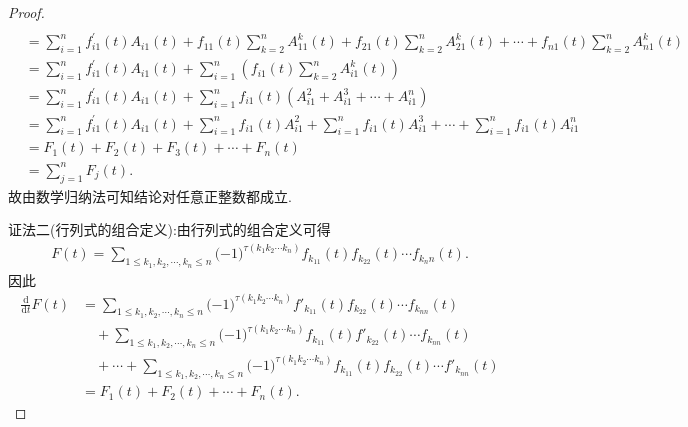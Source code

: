 \documentclass[../../main.tex]{subfiles}%
\begin{document}
\begin{proof}
\begin{align*}
\\
&=\sum_{i=1}^n{f_{i1}^{\prime}\left( t \right) A_{i1}\left( t \right)}+f_{11}\left( t \right) \sum_{k=2}^{n}{A_{11}^{k}(t)}+f_{21}\left( t \right) \sum_{k=2}^{n}{A_{21}^{k}(t)}+\cdots +f_{n1}\left( t \right) \sum_{k=2}^{n}{A_{n1}^{k}(t)}
\\
&=\sum_{i=1}^n{f_{i1}^{\prime}\left( t \right) A_{i1}\left( t \right)}+\sum_{i=1}^n{\left( f_{i1}\left( t \right) \sum_{k=2}^n{A_{i1}^{k}\left( t \right)} \right)}
\\
&=\sum_{i=1}^n{f_{i1}^{\prime}\left( t \right) A_{i1}\left( t \right)}+\sum_{i=1}^n{f_{i1}\left( t \right) \left( A_{i1}^{2}+A_{i1}^{3}+\cdots +A_{i1}^{n} \right)}
\\
&=\sum_{i=1}^n{f_{i1}^{\prime}\left( t \right) A_{i1}\left( t \right)}+\sum_{i=1}^n{f_{i1}\left( t \right) A_{i1}^{2}}+\sum_{i=1}^n{f_{i1}\left( t \right) A_{i1}^{3}}+\cdots +\sum_{i=1}^n{f_{i1}\left( t \right) A_{i1}^{n}}
\\
&=F_1\left( t \right) +F_2\left( t \right) +F_3\left( t \right) +\cdots +F_n\left( t \right) 
\\
&=\sum_{j=1}^n{F_j\left( t \right)}.
\end{align*}
故由数学归纳法可知结论对任意正整数都成立.

{\color{blue}证法二(行列式的组合定义):}由行列式的组合定义可得
\begin{align*}
F(t)=\sum_{1\leqslant k_1,k_2,\cdots ,k_n\leqslant n}{(}-1)^{\tau (k_1k_2\cdots k_n)}f_{k_11}(t)f_{k_22}(t)\cdots f_{k_nn}(t).
\end{align*}
因此
\begin{align*}
\frac{\mathrm{d}}{\mathrm{d}t}F(t)&=\sum_{1\leqslant k_1,k_2,\cdots ,k_n\leqslant n}{(}-1)^{\tau (k_1k_2\cdots k_n)}f'_{k_{11}}(t)f_{k_{22}}(t)\cdots f_{k_{nn}}(t)
\\
&\quad+\sum_{1\leqslant k_1,k_2,\cdots ,k_n\leqslant n}{(}-1)^{\tau (k_1k_2\cdots k_n)}f_{k_{11}}(t)f'_{k_{22}}(t)\cdots f_{k_{nn}}(t)
\\
&\quad+\cdots +\sum_{1\leqslant k_1,k_2,\cdots ,k_n\leqslant n}{(}-1)^{\tau (k_1k_2\cdots k_n)}f_{k_{11}}(t)f_{k_{22}}(t)\cdots f'_{k_{nn}}(t)
\\
&=F_1(t)+F_2(t)+\cdots +F_n(t).
\end{align*}

\end{proof}
\end{document}

